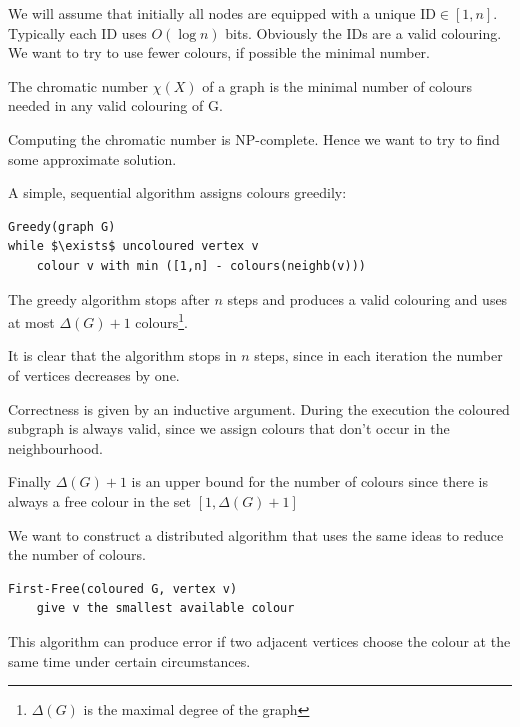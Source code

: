 We will assume that initially all nodes are equipped with a unique ID$\in [1,n]$. Typically each ID uses $O(\log n)$ bits. Obviously the IDs are a valid colouring. We want to try to use fewer colours, if possible the minimal number.

\begin{Def} The chromatic number $\chi(X)$ of a graph is the minimal number of colours needed in any valid colouring of G.
\end{Def}

Computing the chromatic number is NP-complete. Hence we want to try to find some approximate solution.

A simple, sequential algorithm assigns colours greedily:

\begin{lstlisting}
Greedy(graph G)
while $\exists$ uncoloured vertex v
	colour v with min ([1,n] - colours(neighb(v)))
\end{lstlisting}

\begin{thm} The greedy algorithm stops after $n$ steps and produces a valid colouring and uses at most $\Delta(G)+1$ colours\footnote{$\Delta(G)$ is the maximal degree of the graph}.
\end{thm}

\begin{pr} It is clear that the algorithm stops in $n$ steps, since in each iteration the number of vertices decreases by one. 

Correctness is given by an inductive argument. During the execution the coloured subgraph is always valid, since we assign colours that don't occur in the neighbourhood.

Finally $\Delta(G)+1$ is an upper bound for the number of colours since there is always a free colour in the set $[1,\Delta(G)+1]$ 
\end{pr}

We want to construct a distributed algorithm that uses the same ideas to reduce the number of colours.

\begin{lstlisting}
First-Free(coloured G, vertex v)
	give v the smallest available colour
\end{lstlisting}

This algorithm can produce error if two adjacent vertices choose the colour at the same time under certain circumstances.

